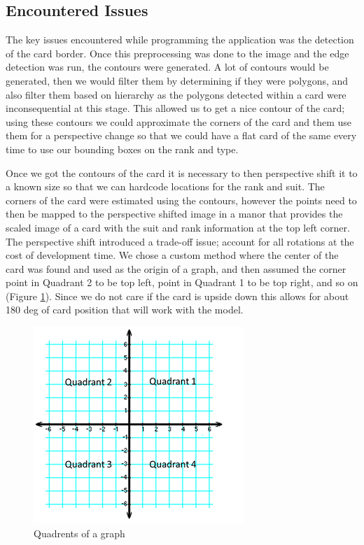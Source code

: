 \documentclass[conference]{IEEEtran}
\begin{document}
\subsection{Encountered Issues}
The key issues encountered while programming the application was the detection of the card border.
Once this preprocessing was done to the image and the edge detection was run, the contours were
generated. A lot of contours would be generated, then we would filter them by determining if they
were polygons, and also filter them based on hierarchy as the polygons detected within a card were
inconsequential at this stage. This allowed us to get a nice contour of the card; using these
contours we could approximate the corners of the card and them use them for a perspective change so
that we could have a flat card of the same every time to use our bounding boxes on the rank and type.

Once we got the contours of the card it is necessary to then perspective shift it to a known size so
that we can hardcode locations for the rank and suit. The corners of the card were estimated using
the contours, however the points need to then be mapped to the perspective shifted image in a manor
that provides the scaled image of a card with the suit and rank information at the top left corner.
The perspective shift introduced a trade-off issue; account for all rotations at the cost of
development time. We chose a custom method where the center of the card was found and used as the
origin of a graph, and then assumed the corner point in Quadrant 2 to be top left, point in Quadrant
1 to be top right, and so on (Figure \ref{fig:graph}). Since we do not care if the card is upside
down this allows for about 180 deg of card position that will work with the model.

\begin{figure}[htbp]
\centerline{\includegraphics{graph-quadrants.png}}
\caption{Quadrents of a graph}
\label{fig:graph}
\end{figure}
\end{document}
